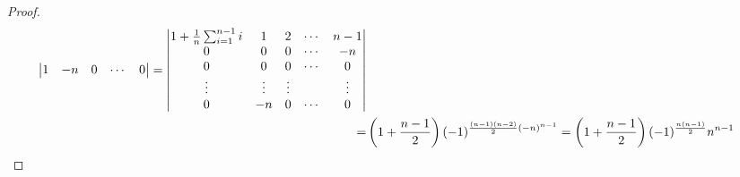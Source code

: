 \begin{proof}
\begin{align*}
\begin{vmatrix}
            1      & -n     & 0      & \cdots & 0
        \end{vmatrix}=
        \begin{vmatrix}
            1+\frac{1}{n}\sum_{i=1}^{n-1}i & 1      & 2      & \cdots & n-1    \\
            0                              & 0      & 0      & \cdots & -n     \\
            0                              & 0      & 0      & \cdots & 0      \\
            \vdots                         & \vdots & \vdots &        & \vdots \\
            0                              & -n     & 0      & \cdots & 0
        \end{vmatrix}                                                   \\
        = & \left( 1+\frac{n-1}{2} \right)(-1)^{\frac{(n-1)(n-2)}{2}(-n)^{n-1}}=\left( 1+\frac{n-1}{2} \right)(-1)^{\frac{n(n-1)}{2}}n^{n-1}
    \end{align*}
\end{proof}

